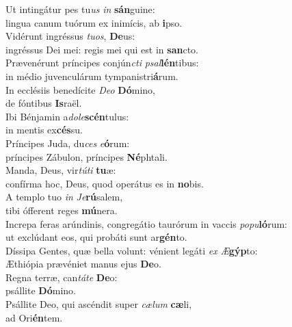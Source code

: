 \oddverse Ut intingátur pes tu\textit{us} \textit{in} \textbf{sán}guine:~\*\\
\oddverse lingua canum tuórum ex inimícis, ab \textbf{i}pso.\\
\evenverse Vidérunt ingréssus \textit{tu}\textit{os}, \textbf{De}us:~\*\\
\evenverse ingréssus Dei mei: regis mei qui est in \textbf{san}cto.\\
\oddverse Prævenérunt príncipes conjún\textit{cti} \textit{psal}\textbf{lén}tibus:~\*\\
\oddverse in médio juvenculárum tympanistri\textbf{á}rum.\\
\evenverse In ecclésiis benedícite \textit{De}\textit{o} \textbf{Dó}mino,~\*\\
\evenverse de fóntibus \textbf{Is}raël.\\
\oddverse Ibi Bénjamin a\textit{do}\textit{le}\textbf{scén}tulus:~\*\\
\oddverse in mentis ex\textbf{cés}su.\\
\evenverse Príncipes Juda, du\textit{ces} \textit{e}\textbf{ó}rum:~\*\\
\evenverse príncipes Zábulon, príncipes \textbf{Né}phtali.\\
\oddverse Manda, Deus, vir\textit{tú}\textit{ti} \textbf{tu}æ:~\*\\
\oddverse confírma hoc, Deus, quod operátus es in \textbf{no}bis.\\
\evenverse A templo tuo \textit{in} \textit{Je}\textbf{rú}salem,~\*\\
\evenverse tibi ófferent reges \textbf{mú}nera.\\
\oddverse Increpa feras arúndinis, congregátio taurórum in vaccis \textit{po}\textit{pu}\textbf{ló}rum:~\*\\
\oddverse ut exclúdant eos, qui probáti sunt ar\textbf{gén}to.\\
\evenverse Díssipa Gentes, quæ bella volunt: vénient legáti \textit{ex} \textit{Æ}\textbf{gýp}to:~\*\\
\evenverse Æthiópia prævéniet manus ejus \textbf{De}o.\\
\oddverse Regna terræ, can\textit{tá}\textit{te} \textbf{De}o:~\*\\
\oddverse psállite \textbf{Dó}mino.\\
\evenverse Psállite Deo, qui ascéndit super \textit{cæ}\textit{lum} \textbf{cæ}li,~\*\\
\evenverse ad Ori\textbf{én}tem.\\
